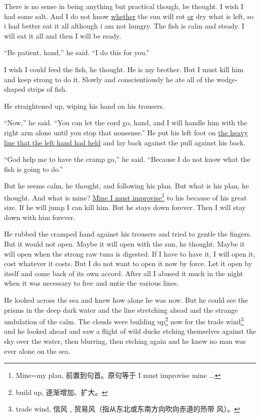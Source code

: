 \documentclass[fontset=ubuntu,zihao=-4]{ctexrep}
\begin{document}
There is no sense in being anything but \gls{practical} though, he thought. I wish
I had some salt. And I do not know \uline{whether} the sun will \gls{rot} \uline{or} dry
what is left, so i had better eat it all although i am not hungry. The fish
is calm and steady. I will eat it all and then I will be ready.

``Be patient, hand,'' he said. ``I do this for you.''

I wish I could feed the fish, he thought. He is my brother. But I must kill
him and keep strong to do it. Slowly and \gls{conscientiously} he ate all of
the wedge-shaped strips of fish.

He straightened up, wiping his hand on his trousers.

``Now,'' he said. ``You can let the cord go, hand, and I will handle him
with the right arm alone until you stop that \gls{nonsense}.'' He put his
left foot on \uline{the heavy line that the left hand had held} and lay back
against the pull against his back.

``God help me to have the cramp go,'' he said. ``Because I do not know what
the fish is going to do.''

But he seems calm, he thought, and following his plan. But what is his plan,
he thought. And what is mine? \uline{Mine I must improvise}\footnote{Mine=my
  plan, 前置到句首。原句等于 I must improvise mine ...} to his because of
his great size. If he will jump I can kill him. But he stays down forever.
Then I will stay down with him forever.

He \gls{rubbed} the cramped hand against his trousers and tried to gentle the
fingers. But it would not open. Maybe it will open with the sun, he thought.
Maybe it will open when the strong raw tuna is \gls{digested}. If I have to
have it, I will open it, cost whatever it costs. But I do not want to open
it now by force. Let it open by itself and come back of its own
\gls{accord}. After all I \gls{abused} it much in the night when it was
necessary to free and \gls{untie} the \gls{various} lines.

He looked across the sea and knew how alone he was now. But he could see the
prisms in the deep dark water and the line \gls{stretching} ahead and the
strange \gls{undulation} of the calm. The clouds were building
up\footnote{build up, 逐渐增加、扩大。} now for the trade
wind\footnote{trade wind, 信风﹐贸易风（指从东北或东南方向吹向赤道的热带
  风）。} and he looked ahead and saw a \gls{flight} of wild ducks \gls{etching}
themselves against the sky over the water, then \gls{blurring}, then etching again
and he knew no man was ever alone on the sea.
\end{document}
